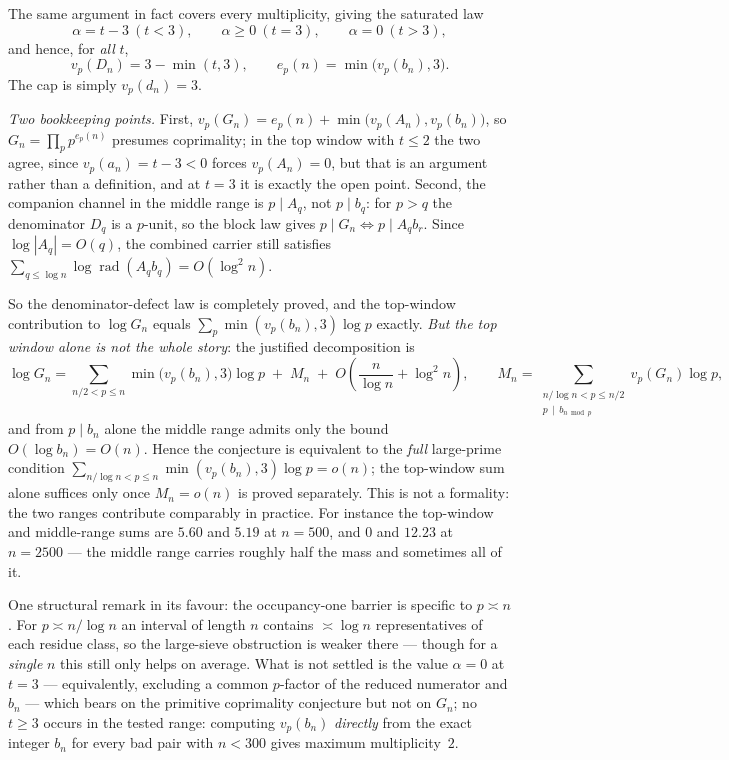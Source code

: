 The same argument in fact covers every multiplicity, giving the saturated law
\[
  \alpha=t-3\ (t<3),\qquad \alpha\ge0\ (t=3),\qquad \alpha=0\ (t>3),
\]
and hence, for \emph{all} $t$,
\[
  \boxed{\;v_p(D_n)=3-\min(t,3),\qquad e_p(n)=\min\bigl(v_p(b_n),3\bigr).\;}
\]
The cap is simply $v_p(d_n)=3$.

\emph{Two bookkeeping points.}  First, $v_p(G_n)=e_p(n)+\min\bigl(v_p(A_n),v_p(b_n)\bigr)$, so
$G_n=\prod_pp^{e_p(n)}$ presumes coprimality; in the top window with $t\le2$ the two agree, since
$v_p(a_n)=t-3<0$ forces $v_p(A_n)=0$, but that is an argument rather than a definition, and at
$t=3$ it is exactly the open point.  Second, the companion channel in the middle range is
$p\mid A_q$, not $p\mid b_q$: for $p>q$ the denominator $D_q$ is a $p$-unit, so the block law gives
$p\mid G_n\iff p\mid A_qb_r$.  Since $\log|A_q|=O(q)$, the combined carrier still satisfies
$\sum_{q\le\log n}\log\operatorname{rad}(A_qb_q)=O(\log^2n)$.

So the denominator-defect law is completely proved, and the top-window contribution to
$\log G_n$ equals $\sum_p\min(v_p(b_n),3)\log p$ exactly.  \emph{But the top window alone is not
the whole story}: the justified decomposition is
\[
  \log G_n=\sum_{n/2<p\le n}\min\bigl(v_p(b_n),3\bigr)\log p
  \;+\;M_n\;+\;O\!\left(\frac n{\log n}+\log^2n\right),
  \qquad
  M_n=\!\!\sum_{\substack{n/\log n<p\le n/2\\ p\,\mid\,b_{n\bmod p}}}\!\!v_p(G_n)\log p,
\]
and from $p\mid b_n$ alone the middle range admits only the bound $O(\log b_n)=O(n)$.  Hence the
conjecture is equivalent to the \emph{full} large-prime condition
$\sum_{n/\log n<p\le n}\min(v_p(b_n),3)\log p=o(n)$; the top-window sum alone suffices only once
$M_n=o(n)$ is proved separately.  This is not a formality: the two ranges contribute comparably in
practice.  For instance the top-window and middle-range sums are $5.60$ and $5.19$ at $n=500$, and
$0$ and $12.23$ at $n=2500$ — the middle range carries roughly half the mass and sometimes all of
it.

One structural remark in its favour: the occupancy-one barrier is specific to $p\asymp n$.  For
$p\asymp n/\log n$ an interval of length $n$ contains $\asymp\log n$ representatives of each
residue class, so the large-sieve obstruction is weaker there — though for a \emph{single} $n$
this still only helps on average.  What is not
settled is the value $\alpha=0$ at $t=3$ — equivalently, excluding a common $p$-factor of the
reduced numerator and $b_n$ — which bears on the primitive coprimality conjecture but not on
$G_n$; no $t\ge3$ occurs in the tested range: computing $v_p(b_n)$ \emph{directly} from the exact
integer $b_n$ for every bad pair with $n<300$ gives maximum multiplicity~$2$.

